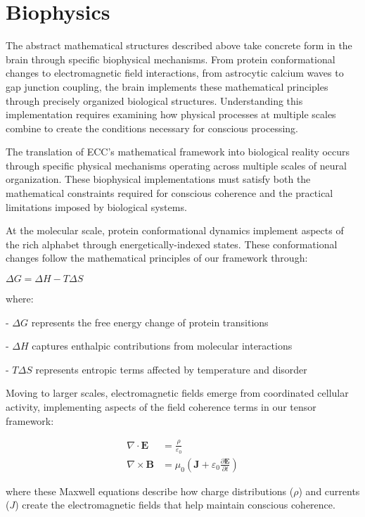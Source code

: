 \section{Biophysics}

The abstract mathematical structures described above take concrete form in the brain through specific biophysical mechanisms. From protein conformational changes to electromagnetic field interactions, from astrocytic calcium waves to gap junction coupling, the brain implements these mathematical principles through precisely organized biological structures. Understanding this implementation requires examining how physical processes at multiple scales combine to create the conditions necessary for conscious processing.

The translation of ECC's mathematical framework into biological reality occurs through specific physical mechanisms operating across multiple scales of neural organization. These biophysical implementations must satisfy both the mathematical constraints required for conscious coherence and the practical limitations imposed by biological systems.

At the molecular scale, protein conformational dynamics implement aspects of the rich alphabet through energetically-indexed states. These conformational changes follow the mathematical principles of our framework through:

$\Delta G = \Delta H - T\Delta S$

where:

- $\Delta G$ represents the free energy change of protein transitions

- $\Delta H$ captures enthalpic contributions from molecular interactions

- $T \Delta S$ represents entropic terms affected by temperature and disorder

Moving to larger scales, electromagnetic fields emerge from coordinated cellular activity, implementing aspects of the field coherence terms in our tensor framework:

\begin{align}
\nabla \cdot \mathbf{E} &= \frac{\rho}{\varepsilon_0} \\
\nabla \times \mathbf{B} &= \mu_0(\mathbf{J} + \varepsilon_0\frac{\partial \mathbf{E}}{\partial t})
\end{align}

where these Maxwell equations describe how charge distributions ($\rho$) and currents ($J$) create the electromagnetic fields that help maintain conscious coherence.

